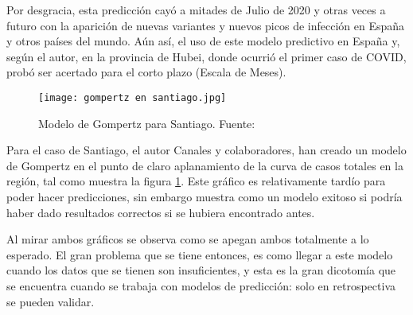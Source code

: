 Por desgracia, esta predicción cayó a mitades de Julio de 2020 y otras veces a futuro con la aparición de nuevas variantes y nuevos picos de infección en España y otros países del mundo. Aún así, el uso de este modelo predictivo en España y, según el autor, en la provincia de Hubei, donde ocurrió el primer caso de COVID, probó ser acertado para el corto plazo (Escala de Meses).

\begin{figure}
    \texttt{[image: gompertz en santiago.jpg]}
    \caption{Modelo de Gompertz para Santiago. Fuente: \cite{canals_cuadrado_canals_2021}}
    \label{gompertz santiago}
\end{figure}

Para el caso de Santiago, el autor Canales y colaboradores\cite{canals_cuadrado_canals_2021}, han creado un modelo de Gompertz en el punto de claro aplanamiento de la curva de casos totales en la región, tal como muestra la figura \ref{gompertz santiago}. Este gráfico es relativamente tardío para poder hacer predicciones, sin embargo muestra como un modelo exitoso si podría haber dado resultados correctos si se hubiera encontrado antes.

Al mirar ambos gráficos se observa como se apegan ambos totalmente a lo esperado. El gran problema que se tiene entonces, es como llegar a este modelo cuando los datos que se tienen son insuficientes, y esta es la gran dicotomía que se encuentra cuando se trabaja con modelos de predicción: solo en retrospectiva se pueden validar.

